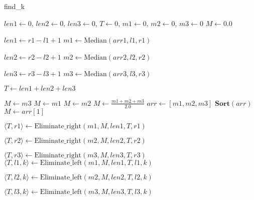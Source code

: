 \documentclass{article}
\begin{document}
\begin{algorithm}
\caption{find\_k}
\footnotesize
\begin{algorithmic}[1]
        \State $len1 \gets 0$, $len2 \gets 0$, $len3 \gets 0$, $T \gets 0$, $m1 \gets 0$, $m2 \gets 0$, $m3 \gets 0$
        \State $M \gets 0.0$

            \State $len1 \gets r1 - l1 + 1$
            \State $m1 \gets \text{Median}(arr1, l1, r1)$
        \EndIf

            \State $len2 \gets r2 - l2 + 1$
            \State $m2 \gets \text{Median}(arr2, l2, r2)$
        \EndIf

            \State $len3 \gets r3 - l3 + 1$
            \State $m3 \gets \text{Median}(arr3, l3, r3)$
        \EndIf

        \State $T \gets len1 + len2 + len3$

            \State $M \gets m3$
            \State $M \gets m1$
            \State $M \gets m2$
            \State $M \gets \frac{m1 + m2 + m3}{2.0}$
        \Else
            \State $arr \gets [m1, m2, m3]$
            \State $\textbf{Sort}(arr)$
            \State $M \gets arr[1]$
        \EndIf

                \State $\langle T, r1 \rangle \gets \text{Eliminate\_right}(m1, M, len1, T, r1)$
            \EndIf

                \State $\langle T, r2 \rangle \gets \text{Eliminate\_right}(m2, M, len2, T, r2)$
            \EndIf

                \State $\langle T, r3 \rangle \gets \text{Eliminate\_right}(m3, M, len3, T, r3)$
            \EndIf
        \Else
                \State $\langle T, l1, k \rangle \gets \text{Eliminate\_left}(m1, M, len1, T, l1, k)$
            \EndIf

                \State $\langle T, l2, k \rangle \gets \text{Eliminate\_left}(m2, M, len2, T, l2, k)$
            \EndIf

                \State $\langle T, l3, k \rangle \gets \text{Eliminate\_left}(m3, M, len3, T, l3, k)$
        \EndIf


\end{algorithmic}
\end{algorithm}
\end{document}

